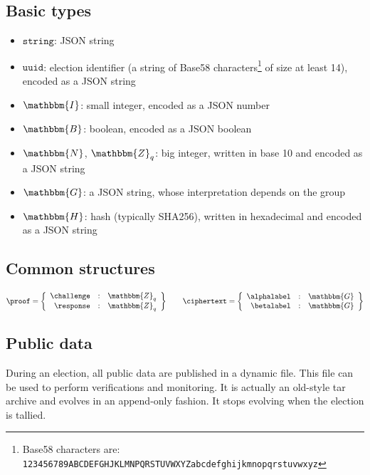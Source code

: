 \documentclass[a4paper]{article}
\newcommand{\G}{\mathbbm{G}}
\newcommand{\Z}{\mathbbm{Z}}
\newcommand{\N}{\mathbbm{N}}
\newcommand{\hash}{\mathbbm{H}}
\newcommand{\I}{\mathbbm{I}}
\newcommand{\B}{\mathbbm{B}}
\newcommand{\jstring}{\texttt{string}}
\newcommand{\uuid}{\texttt{uuid}}
\begin{document}
\subsection{Basic types}
\label{basic-types}

\begin{itemize}
\item $\jstring$: JSON string
\item $\uuid$: election identifier (a string of
  Base58 characters\footnote{Base58 characters are:
    \texttt{123456789ABCDEFGHJKLMNPQRSTUVWXYZabcdefghijkmnopqrstuvwxyz}}
  of size at least 14), encoded as a JSON string
\item $\I$: small integer, encoded as a JSON number
\item $\B$: boolean, encoded as a JSON boolean
\item $\N$, $\Z_q$: big integer, written in base 10 and encoded as a
  JSON string
\item $\G$: a JSON string, whose interpretation depends on the group
\item $\hash$: hash (typically SHA256), written in hexadecimal and
  encoded as a JSON string
\end{itemize}

\subsection{Common structures}
\label{common}

\begin{gather*}
  \proof=\left\{
    \begin{array}{rcl}
      \challenge&:&\Z_q\\
      \response&:&\Z_q
    \end{array}
  \right\}
  \qquad
  \ciphertext=\left\{
    \begin{array}{rcl}
      \alphalabel&:&\G\\
      \betalabel&:&\G
    \end{array}
  \right\}
\end{gather*}

\subsection{Public data}
\label{public-data}

During an election, all public data are published in a dynamic
file. This file can be used to perform verifications and
monitoring. It is actually an old-style tar archive and evolves in an
append-only fashion. It stops evolving when the election is tallied.
\end{document}
